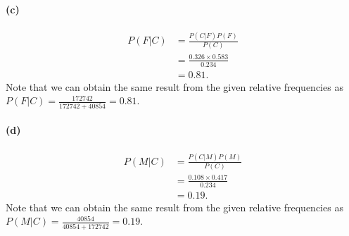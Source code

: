 \paragraph{(c)}
\begin{align*}
	P(F|C) &= \frac{P(C|F)P(F)}{P(C)}\\
	&= \frac{0.326 \times 0.583}{0.234}\\
	&= 0.81.
\end{align*}
Note that we can obtain the same result from the given relative frequencies as $P(F|C) = \frac{172742}{172742+40854} = 0.81$.
\paragraph{(d)}
\begin{align*}
	P(M|C) &= \frac{P(C|M)P(M)}{P(C)}\\
	&= \frac{0.108 \times 0.417}{0.234}\\
	&= 0.19.
\end{align*}
Note that we can obtain the same result from the given relative frequencies as $P(M|C) = \frac{40854}{40854+172742} = 0.19$.
